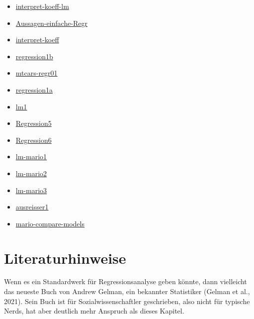 \documentclass[
  letterpaper,
]{scrbook}
\providecommand{\tightlist}{%
  \setlength{\itemsep}{0pt}\setlength{\parskip}{0pt}}\usepackage{longtable,booktabs,array}
\theoremstyle{definition}
\theoremstyle{definition}
\theoremstyle{definition}
\theoremstyle{remark}
\begin{document}
\begin{itemize}
\tightlist
\item
  \href{https://datenwerk.netlify.app/posts/interpret-koeff-lm/interpret-koeff-lm.html}{interpret-koeff-lm}
\item
  \href{https://datenwerk.netlify.app/posts/aussagen-einfache-regr/aussagen-einfache-regr}{Aussagen-einfache-Regr}
\item
  \href{https://datenwerk.netlify.app/posts/interpret-koeff/interpret-koeff.html}{interpret-koeff}
\item
  \href{https://datenwerk.netlify.app/posts/regression1b/regression1b.html}{regression1b}
\item
  \href{https://datenwerk.netlify.app/posts/mtcars-regr01/mtcars-regr01.html}{mtcars-regr01}
\item
  \href{https://datenwerk.netlify.app/posts/regression1a/regression1a.html}{regression1a}
\item
  \href{https://datenwerk.netlify.app/posts/lm1/lm1.html}{lm1}
\item
  \href{https://datenwerk.netlify.app/posts/regression5/regression5}{Regression5}
\item
  \href{https://datenwerk.netlify.app/posts/regression6/regression6}{Regression6}
\item
  \href{https://datenwerk.netlify.app/posts/lm-mario1/lm-mario1.html}{lm-mario1}
\item
  \href{https://datenwerk.netlify.app/posts/lm-mario2/lm-mario2.html}{lm-mario2}
\item
  \href{https://datenwerk.netlify.app/posts/lm-mario3/lm-mario3.html}{lm-mario3}
\item
  \href{https://datenwerk.netlify.app/posts/ausreisser1/ausreisser1.html}{ausreisser1}
\item
  \href{https://datenwerk.netlify.app/posts/mario-compare-models/}{mario-compare-models}
\end{itemize}

\section{Literaturhinweise}\label{literaturhinweise-8}

Wenn es ein Standardwerk für Regressionsanalyse geben könnte, dann
vielleicht das neueste Buch von Andrew Gelman, ein bekannter Statistiker
(Gelman et al., 2021). Sein Buch ist für Sozialwissenschaftler
geschrieben, also nicht für typische Nerds, hat aber deutlich mehr
Anspruch als dieses Kapitel.
\end{document}

